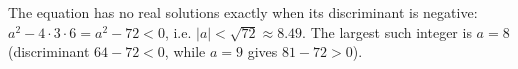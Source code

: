 The equation has no real solutions exactly when its discriminant is negative: $a^2-4\cdot3\cdot6=a^2-72<0$, i.e. $|a|<\sqrt{72}\approx8.49$. The largest such integer is $a=\boxed{8}$ (discriminant $64-72<0$, while $a=9$ gives $81-72>0$).
